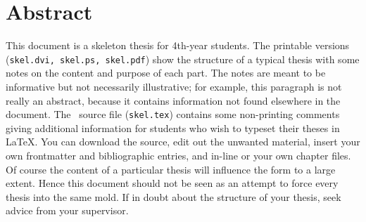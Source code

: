 \documentclass[12pt,openany,a4paper]{book}
\begin{document}
\chapter{Abstract}


This document is a skeleton thesis for 4th-year students.  The
printable versions (\texttt{skel.dvi, skel.ps, skel.pdf})
show the structure of a typical thesis with some notes on the content
and purpose of each part.  The notes are meant to be informative but
not necessarily illustrative; for example, this paragraph is not
really an abstract, because it contains information not found
elsewhere in the document.  The \LaTeXe\ source file
(\texttt{skel.tex}) contains some non-printing comments giving
additional information for students who wish to typeset their theses
in \LaTeX.  You can download the source, edit out the unwanted
material, insert your own frontmatter and bibliographic entries, and
in-line or \verb++ your own chapter files.  Of course the
content of a particular thesis will influence the form to a large
extent.  Hence this document should not be seen as an attempt to force
every thesis into the same mold.  If in doubt about the structure of
your thesis, seek advice from your supervisor.

\tableofcontents

\listoffigures
{}

\listoftables
{}

% 

\cleardoublepage

\mainmatter


%
%
%
%	
%	
\end{document}
